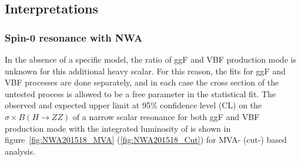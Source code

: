 %


\subsection{Interpretations}
\label{sec:hmhzz_spin0nwa}

\subsubsection{Spin-0 resonance with NWA}

In the absence of a specific model, the ratio of ggF and VBF production mode is unknown for this additional heavy scalar.
For this reason, the fits for ggF and VBF processes are done separately, and in each case the cross section of the untested process is allowed to be a free parameter in the statistical fit.
The observed and expected upper limit at 95\% confidence level (CL) on the $\sigma \times B(H \rightarrow ZZ)$ of a narrow scalar resonance for both ggF and VBF production mode with the integrated luminosity of \lumi is shown in figure~\ref{fig:NWA201518_MVA} (\ref{fig:NWA201518_Cut}) for MVA- (cut-) based analysis.

